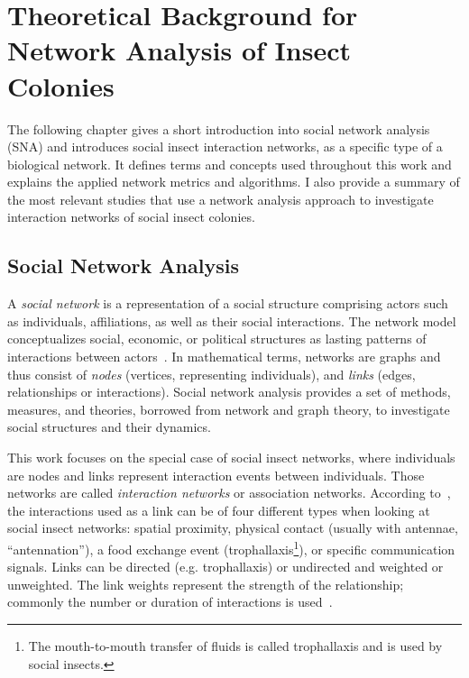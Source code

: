 \chapter{Theoretical Background for Network Analysis of Insect Colonies}
\label{ch:foundation}
The following chapter gives a short introduction into social network analysis (SNA) and introduces social insect interaction networks, as a specific type of a biological network. It defines terms and concepts used throughout this work and explains the applied network metrics and algorithms.
I also provide a summary of the most relevant studies that use a network analysis approach to investigate interaction networks of social insect colonies.

\section{Social Network Analysis}
\label{ch:bg}

A \emph{social network} is a representation of a social structure comprising actors such as individuals, affiliations, as well as their social interactions.
The network model conceptualizes social, economic, or political structures as lasting patterns of interactions between actors~\cite{wasserman1994social}.
In mathematical terms, networks are graphs and thus consist of \emph{nodes} (vertices, representing individuals), and \emph{links} (edges, relationships or interactions).
Social network analysis provides a set of methods, measures, and theories, borrowed from network and graph theory, to investigate social structures and their dynamics.

This work focuses on the special case of social insect networks, where individuals are nodes and links represent interaction events between individuals. Those networks are called \emph{interaction networks} or association networks.
According to~\textcite{charbonneau2013social}, the interactions used as a link can be of four different types when looking at social insect networks: spatial proximity, physical contact (usually with antennae, ``antennation''), a food exchange event (trophallaxis\footnote{The mouth-to-mouth transfer of fluids is called trophallaxis and is used by social insects.}), or specific communication signals.
Links can be directed (e.g. trophallaxis) or undirected and weighted or unweighted. The link weights represent the strength of the relationship; commonly the number or duration of interactions is used~\cite{farine2015constructing}.

